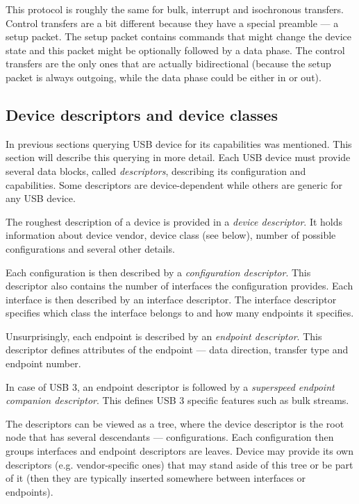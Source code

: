 This protocol is roughly the same for bulk, interrupt and isochronous
transfers. Control transfers are a bit different because they have a special
preamble — a setup packet. The setup packet contains commands that might
change the device state and this packet might be optionally followed by a data
phase. The control transfers are the only ones that are actually bidirectional
(because the setup packet is always outgoing, while the data phase could be
either in or out).

\subsection{Device descriptors and device classes}

In previous sections querying USB device for its capabilities was mentioned.
This section will describe this querying in more detail. Each USB device must
provide several data blocks, called \textit{descriptors}, describing its
configuration and capabilities. Some descriptors are device-dependent while
others are generic for any USB device.

The roughest description of a device is provided in a \textit{device
descriptor}. It holds information about device vendor, device class (see
below), number of possible configurations and several other details.

Each configuration is then described by a \textit{configuration descriptor}.
This descriptor also contains the number of interfaces the configuration
provides. Each interface is then described by an interface descriptor. The
interface descriptor specifies which class the interface belongs to and how
many endpoints it specifies.

Unsurprisingly, each endpoint is described by an \textit{endpoint descriptor}.
This descriptor defines attributes of the endpoint — data direction, transfer
type and endpoint number.

In case of USB 3, an endpoint descriptor is followed by a \textit{superspeed
endpoint companion descriptor}. This defines USB 3 specific features such as
bulk streams.

The descriptors can be viewed as a tree, where the device descriptor is the
root node that has several descendants — configurations. Each configuration
then groups interfaces and endpoint descriptors are leaves. Device may provide
its own descriptors (e.g. vendor-specific ones) that may stand aside of this
tree or be part of it (then they are typically inserted somewhere between
interfaces or endpoints).

